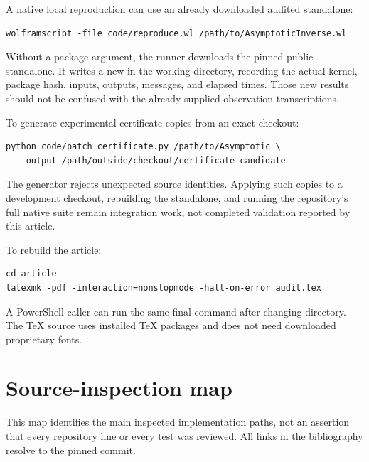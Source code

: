 \documentclass[11pt,letterpaper]{article}
\newcommand{\code}[1]{\texttt{\detokenize{#1}}}
\begin{document}
A native local reproduction can use an already downloaded audited standalone:
\begin{lstlisting}
wolframscript -file code/reproduce.wl /path/to/AsymptoticInverse.wl
\end{lstlisting}
Without a package argument, the runner downloads the pinned public standalone. It writes a new \code{audit-native-results.json} in the working directory, recording the actual kernel, package hash, inputs, outputs, messages, and elapsed times. Those new results should not be confused with the already supplied observation transcriptions.

To generate experimental certificate copies from an exact checkout:
\begin{lstlisting}
python code/patch_certificate.py /path/to/Asymptotic \
  --output /path/outside/checkout/certificate-candidate
\end{lstlisting}
The generator rejects unexpected source identities. Applying such copies to a development checkout, rebuilding the standalone, and running the repository's full native suite remain integration work, not completed validation reported by this article.

To rebuild the article:
\begin{lstlisting}
cd article
latexmk -pdf -interaction=nonstopmode -halt-on-error audit.tex
\end{lstlisting}
A PowerShell caller can run the same final command after changing directory. The TeX source uses installed TeX packages and does not need downloaded proprietary fonts.

\section{Source-inspection map}
\label{sec:coverage}
This map identifies the main inspected implementation paths, not an assertion that every repository line or every test was reviewed. All links in the bibliography resolve to the pinned commit.
\end{document}
